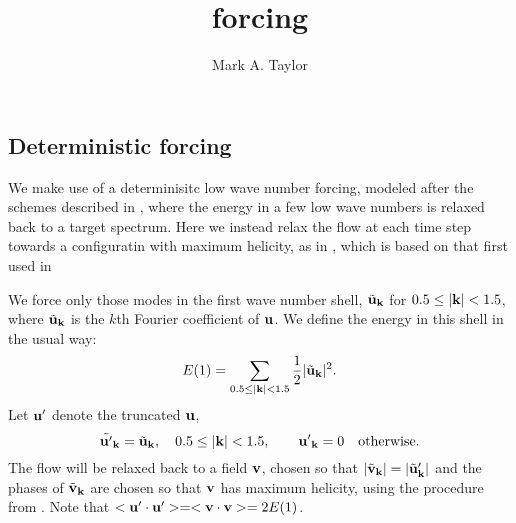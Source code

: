 \documentclass[pre,preprint,showpacs]{revtex4}
\begin{document}
\title{forcing}
\author{Mark A. Taylor}


\subsection{Deterministic forcing \label{forcing_det}}
We make use of a determinisitc low wave number forcing, modeled after
the schemes described in \cite{Kerr94,SVBSCC96,OvePop98}, where the
energy in a few low wave numbers is relaxed back to a target spectrum.
Here we instead relax the flow at each time step towards a configuratin
with maximum helicity, as in \cite{Kurien04}, which is based on
that first used in \cite{PolSht89}

We force only those modes in the first wave number shell, 
$\tilde {\bf u}_{\bf k}$ for $0.5 \le |{\bf k}| < 1.5$, 
where $\tilde {\bf u}_{\bf k}$ is the $k$th Fourier coefficient of
${\bf u}$.
We define the energy in this shell in 
the usual way:
\begin{equation}
E(1) = \sum_{0.5 \le |{\bf k}| < 1.5} \frac12 | \tilde {\bf u}_{\bf k} | ^2.
\end{equation}
Let ${\bf u'}$ denote the truncated ${\bf u}$,
\begin{equation}
 \tilde {\bf u'}_{\bf k} = \tilde {\bf u}_{\bf k}, \quad 0.5 \le |{\bf k}| <1.5,
\qquad {\bf u'}_{\bf k}=0 \quad \text{otherwise}.
\end{equation}
The flow will be relaxed back to a field
${\bf v}$, chosen so that 
$| \tilde {\bf v}_{\bf k}| = |\tilde {\bf u}'_{\bf k}| $
and the phases of $\tilde {\bf v}_{\bf k}$ are chosen so that $\bf v$ has
maximum helicity, using the procedure from \cite{PolSht89}. 
Note that $< {\bf u}' \cdot {\bf u}' > = < {\bf v} \cdot {\bf v} >  = 2 E(1)  $. 
\end{document}
